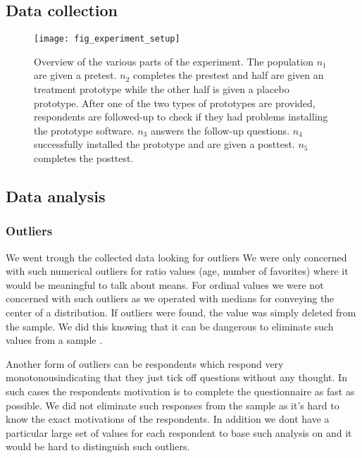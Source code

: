 \subsection{Data collection}

\begin{figure}
  \texttt{[image: fig\_experiment\_setup]}
  \caption[Experiment Overview]{
    Overview of the various parts of the experiment. The population $n_1$
    are given a pretest. $n_2$ completes the prestest and half are given
    an treatment prototype while the other half is given a placebo
    prototype. After one of the two types of prototypes
    are provided, respondents are followed-up to check
    if they had problems installing the prototype software. $n_3$ answers
    the follow-up questions.
    $n_4$ successfully installed the prototype and are given a posttest.
    $n_5$ completes the posttest.
  }
  \label{figure:fig.experiment.setup}
\end{figure}

\subsection{Data analysis}

\subsubsection{Outliers}

We went trough the collected data looking for outliers
\dash{}
We were only concerned with such numerical outliers for ratio values
(age, number of favorites) where it would be meaningful to talk about means.
For ordinal values we were not concerned with such outliers as we operated
with medians for conveying the center of a distribution.
If outliers were found, the value was simply deleted from the sample. We did
this knowing that it can be dangerous to eliminate such values from a sample
\citep[]{greene03}.

Another form of outliers can be respondents which respond very
monotonous\dash{}indicating that they just tick off questions without any
thought. In such cases the respondents motivation is to complete the
questionnaire as fast as possible. We did not eliminate such responses from
the sample as it's hard to know the exact motivations of the respondents.
In addition we dont have a particular large set of values for each respondent
to base such analysis on and it would be hard to distinguish such outliers.


